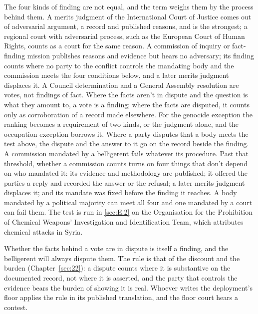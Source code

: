 The four kinds of finding are not equal, and the term weighs them by the process behind them. A merits judgment of the International Court of Justice comes out of adversarial argument, a record and published reasons, and is the strongest; a regional court with adversarial process, such as the European Court of Human Rights, counts as a court for the same reason. A commission of inquiry or fact-finding mission publishes reasons and evidence but hears no adversary; its finding counts where no party to the conflict controls the mandating body and the commission meets the four conditions below, and a later merits judgment displaces it. A Council determination and a General Assembly resolution are votes, not findings of fact. Where the facts aren't in dispute and the question is what they amount to, a vote is a finding; where the facts are disputed, it counts only as corroboration of a record made elsewhere. For the genocide exception the ranking becomes a requirement of two kinds, or the judgment alone, and the occupation exception borrows it. Where a party disputes that a body meets the test above, the dispute and the answer to it go on the record beside the finding. A commission mandated by a belligerent fails whatever its procedure. Past that threshold, whether a commission counts turns on four things that don't depend on who mandated it: its evidence and methodology are published; it offered the parties a reply and recorded the answer or the refusal; a later merits judgment displaces it; and its mandate was fixed before the finding it reaches. A body mandated by a political majority can meet all four and one mandated by a court can fail them. The test is run in \ref{sec:E.2} on the Organisation for the Prohibition of Chemical Weapons' Investigation and Identification Team, which attributes chemical attacks in Syria.

Whether the facts behind a vote are in dispute is itself a finding, and the belligerent will always dispute them. The rule is that of the discount and the burden (Chapter~\ref{sec:22}): a dispute counts where it is substantive on the documented record, not where it is asserted, and the party that controls the evidence bears the burden of showing it is real. Whoever writes the deployment's floor applies the rule in its published translation, and the floor court hears a contest.

